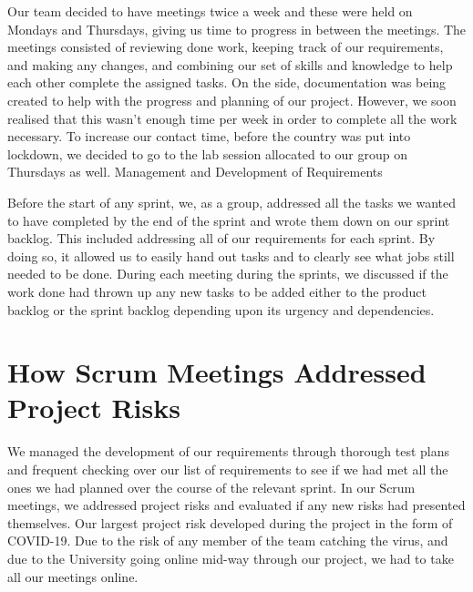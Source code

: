 \documentclass[10pt, notitlepage]{report}
\begin{document}
Our team decided to have meetings twice a week and these were held on Mondays and Thursdays, giving us time to progress in between the meetings. The meetings consisted of reviewing done work, keeping track of our requirements, and making any changes, and combining our set of skills and knowledge to help each other complete the assigned tasks. On the side, documentation was being created to help with the progress and planning of our project. However, we soon realised that this wasn’t enough time per week in order to complete all the work necessary. To increase our contact time, before the country was put into lockdown, we decided to go to the lab session allocated to our group on Thursdays as well.
Management and Development of Requirements

Before the start of any sprint, we, as a group, addressed all the tasks we wanted to have completed by the end of the sprint and wrote them down on our sprint backlog. This included addressing all of our requirements for each sprint. By doing so, it allowed us to easily hand out tasks and to clearly see what jobs still needed to be done. During each meeting during the sprints, we discussed if the work done had thrown up any new tasks to be added either to the product backlog or the sprint backlog depending upon its urgency and dependencies.

\section{How Scrum Meetings Addressed Project Risks}

We managed the development of our requirements through thorough test plans and frequent checking over our list of requirements to see if we had met all the ones we had planned over the course of the relevant sprint.  In our Scrum meetings, we addressed project risks and evaluated if any new risks had presented themselves. Our largest project risk developed during the project in the form of COVID-19. Due to the risk of any member of the team catching the virus, and due to the University going online mid-way through our project, we had to take all our meetings online. 
\end{document}

